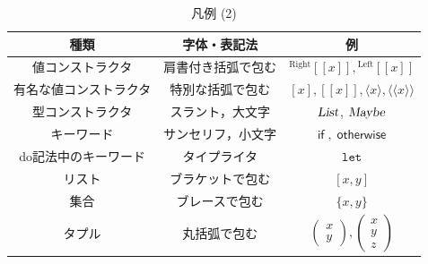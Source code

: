 \documentclass[a5paper,twoside,fleqn,draft]{jsbook}
\def\[{[\![}
\def\]{]\!]}
\newcommand{\Langle}{\langle\!\langle}
\newcommand{\Rangle}{\rangle\!\rangle}
\newcommand{\mKeyword}[1]{\mathsf{#1}}
\newcommand{\mVarKeyword}[1]{\texttt{#1}}
\newcommand{\mDoLetKeyword}{\mVarKeyword{let}}
\newcommand{\mIfKeyword}{\mKeyword{if}}
\newcommand{\mOtherwiseKeyword}{\mKeyword{otherwise}}
\DeclareMathOperator{\mIf}{\mIfKeyword}
\DeclareMathOperator{\mOtherwise}{\mOtherwiseKeyword}
\newcommand{\mTypeConstructor}[1]{\textsl{#1}}
\DeclareMathOperator{\mListTypeConstructor}{\mTypeConstructor{List}}
\DeclareMathOperator{\mMaybeTypeConstructor}{\mTypeConstructor{Maybe}}
\newcommand{\mValueConstructor}[1]{\mathrm{#1}}
\newcommand{\mValueWith}[2]{{}^\mValueConstructor{#1}\[#2\]}
\newcommand{\mLeftWith}[1]{\mValueWith{Left}{#1}}
\newcommand{\mRightWith}[1]{\mValueWith{Right}{#1}}
\newcommand{\mArrowWith}[1]{\Langle#1\Rangle}
\newcommand{\mFuncWith}[1]{\langle#1\rangle}  %
\newcommand{\mPureWith}[1]{\[#1\]}
\newcommand{\mPairWith}[2]{\begin{pmatrix}#1\\#2\end{pmatrix}}
\newcommand{\mTripleWith}[3]{\begin{pmatrix}#1\\#2\\#3\end{pmatrix}}
\begin{document}
\begin{table}[p]
\caption{凡例 (2)}
\begin{center}
\begin{tabular}{||c|c|c||}
\hline
種類&字体・表記法&例\\
\hline\hline
値コンストラクタ&肩書付き括弧で包む&$\mRightWith{x},\mLeftWith{x}$\\
有名な値コンストラクタ&特別な括弧で包む&$[x],\mPureWith{x},\mFuncWith{x},\mArrowWith{x}$\\
\hline
型コンストラクタ&スラント，大文字&$\mListTypeConstructor$, $\mMaybeTypeConstructor$\\
\hline
キーワード&サンセリフ，小文字&$\mIf,\mOtherwise$\\
do記法中のキーワード&タイプライタ&$\mDoLetKeyword$\\
\hline
リスト&ブラケットで包む&$[x,y]$\\
集合&ブレースで包む&$\{x,y\}$\\
タプル&丸括弧で包む&$\mPairWith{x}{y},\mTripleWith{x}{y}{z}$\\
\hline
\end{tabular}
\end{center}
\end{table}
\end{document}
